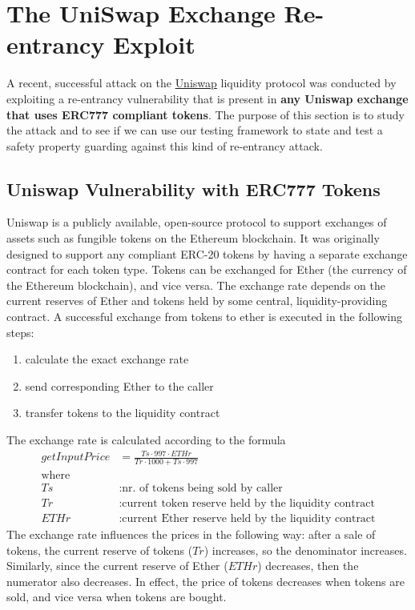 \documentclass[twoside,11pt,openright]{report}
\begin{document}
\section{The UniSwap Exchange Re-entrancy Exploit}
\label{sec:uniswap}
A recent, successful attack on the \href{https://uniswap.org/}{Uniswap} liquidity protocol was conducted by exploiting a re-entrancy vulnerability that is present in \textbf{any Uniswap exchange that uses ERC777 compliant tokens}. The purpose of this section is to study the attack and to see if we can use our testing framework to state and test a safety property guarding against this kind of re-entrancy attack.

\subsection{Uniswap Vulnerability with ERC777 Tokens}
\label{sec:uniswap-intro}
Uniswap is a publicly available, open-source protocol to support exchanges of assets such as fungible tokens on the Ethereum blockchain. It was originally designed to support any compliant ERC-20 tokens by having a separate exchange contract for each token type. Tokens can be exchanged for Ether (the currency of the Ethereum blockchain), and vice versa. The exchange rate depends on the current reserves of Ether and tokens held by some central, liquidity-providing contract. A successful exchange from tokens to ether is executed in the following steps:
\begin{enumerate}
    \item calculate the exact exchange rate
    \item send corresponding Ether to the caller
    \item transfer tokens to the liquidity contract
\end{enumerate}
The exchange rate is calculated according to the formula
\begin{equation*}
\begin{split}
getInputPrice &= \frac{Ts \cdot 997 \cdot ETHr}{Tr \cdot 1000 + Ts \cdot 997}\\
\text{where}&\\
Ts&: \text{nr. of tokens being sold by caller} \\
Tr&: \text{current token reserve held by the liquidity contract} \\
ETHr&: \text{current Ether reserve held by the liquidity contract}
\end{split}
\end{equation*}
The exchange rate influences the prices in the following way: after a sale of tokens, the current reserve of tokens ($Tr$) increases, so the denominator increases. Similarly, since the current reserve of Ether ($ETHr$) decreases, then the numerator also decreases. In effect, the price of tokens decreases when tokens are sold, and vice versa when tokens are bought.
\end{document}
